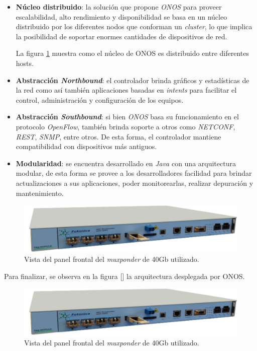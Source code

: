 \begin{itemize}
	\item \textbf{Núcleo distribuido}: la solución que propone \textit{ONOS} para proveer escalabilidad, alto rendimiento y disponibilidad se basa en un núcleo distribuido por los diferentes nodos que conforman un \textit{cluster}, lo que implica la posibilidad de soportar enormes cantidades de dispositivos de red. 
	
	La figura \ref{fig:onosdistribuido} muestra como el núcleo de ONOS es distribuido entre diferentes hosts.

	\item \textbf{Abstracción \textit{Northbound}}: el controlador brinda gráficos y estadísticas de la red como así también aplicaciones basadas en \textit{intents} para facilitar el control, administración y configuración de los equipos.
	\item \textbf{Abstracción \textit{Southbound}}: si bien \textit{ONOS} basa su funcionamiento en el protocolo \textit{OpenFlow}, también brinda soporte a otros como \textit{NETCONF}, \textit{REST}, \textit{SNMP}, entre otros. De esta forma, el controlador mantiene compatibilidad con dispositivos más antiguos.
	\item \textbf{Modularidad}: se encuentra desarrollado en \textit{Java} con una arquitectura modular, de esta forma se provee a los desarrolladores facilidad para brindar actualizaciones a sus aplicaciones, poder monitorearlas, realizar depuración y mantenimiento.  
\end{itemize}

\begin{figure}[H]
	\centering
	\includegraphics[scale=0.9]{Figures/mux40.pdf}
	\caption{Vista del panel frontal del \textit{muxponder} de 40Gb utilizado.}
	\label{fig:onosdistribuido}
  \end{figure}

  Para finalizar, se observa en la figura [] la arquitectura desplegada por ONOS.

  \begin{figure}[H]
	\centering
	\includegraphics[scale=0.9]{Figures/mux40.pdf}
	\caption{Vista del panel frontal del \textit{muxponder} de 40Gb utilizado.}
	\label{fig:onosarch}
  \end{figure}

